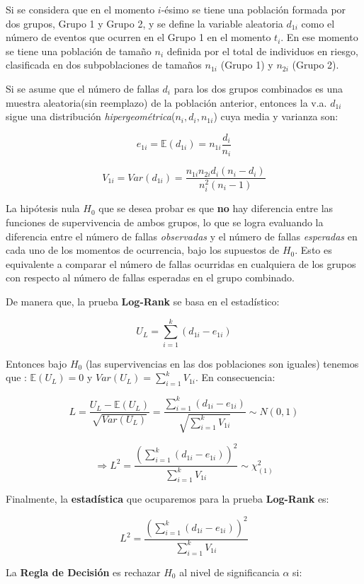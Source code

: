 \documentclass[
  a4paper,
  oneside,
  openany]{book}
\begin{document}
Si se considera que en el momento \(i\)-ésimo se tiene una población formada por dos grupos, Grupo 1 y Grupo 2, y se define la variable aleatoria \(d_{1i}\) como el número de eventos que ocurren en el Grupo 1 en el momento \(t_i\). En ese momento se tiene una población de tamaño \(n_i\) definida por el total de individuos en riesgo, clasificada en dos subpoblaciones de tamaños \(n_{1i}\) (Grupo 1) y \(n_{2i}\) (Grupo 2).

Si se asume que el número de fallas \(d_i\) para los dos grupos combinados es una muestra aleatoria(sin reemplazo) de la población anterior, entonces la v.a. \(d_{1i}\) sigue una distribución \emph{hipergeométrica}(\(n_{i},d_{i},n_{1i}\)) cuya media y varianza son:

\[
e_{1i} = \mathbb{E}(d_{1i}) = n_{1i} \frac{d_{i}}{n_{i}}
\]

\[
V_{1i}= Var(d_{1i}) = \frac{n_{1i}n_{2i}d_{i}(n_{i}-d_{i})}{n_{i}^2(n_{i}-1)}
\]

La hipótesis nula \(H_0\) que se desea probar es que \textbf{no} hay diferencia entre las funciones de supervivencia de ambos grupos, lo que se logra evaluando la diferencia entre el número de fallas \emph{observadas} y el número de fallas \emph{esperadas} en cada uno de los momentos de ocurrencia, bajo los supuestos de \(H_0\). Esto es equivalente a comparar el número de fallas ocurridas en cualquiera de los grupos con respecto al número de fallas esperadas en el grupo combinado.

De manera que, la prueba \textbf{Log-Rank} se basa en el estadístico:

\[
U_{L} = \sum_{i = 1}^{k}(d_{1i}-e_{1i})
\]

Entonces bajo \(H_0\) (las supervivencias en las dos poblaciones son iguales) tenemos que : \(\mathbb{E}(U_{L}) = 0\) y \(Var(U_{L}) = \sum_{i=1}^{k}V_{1i}\). En consecuencia:

\[
L = \frac{U_L-\mathbb{E}(U_{L}) }{\sqrt{Var(U_{L})}}= \frac{\sum_{i = 1}^k(d_{1i}-e_{1i})}{\sqrt{\sum_{i=1}^{k}V_{1i}}} \sim N(0,1)
\]

\[
\Longrightarrow L^2= \frac{(\sum_{i = 1}^k(d_{1i}-e_{1i}))^2}{\sum_{i=1}^{k}V_{1i}} \sim \chi^2_{(1)}
\]

Finalmente, la \textbf{estadística} que ocuparemos para la prueba \textbf{Log-Rank} es:

\[
L^2= \frac{(\sum_{i = 1}^k(d_{1i}-e_{1i}))^2}{\sum_{i=1}^{k}V_{1i}}
\]

La \textbf{Regla de Decisión} es rechazar \(H_0\) al nivel de significancia \(\alpha\) si:
\end{document}
